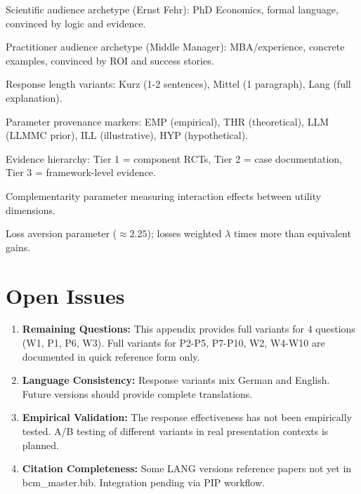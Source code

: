 \begin{description}[nosep]
    \item[$\mathcal{W}$ (Wissenschaft)] Scientific audience archetype (Ernst Fehr): PhD Economics, formal language, convinced by logic and evidence.

    \item[$\mathcal{P}$ (Praxis)] Practitioner audience archetype (Middle Manager): MBA/experience, concrete examples, convinced by ROI and success stories.

    \item[K/M/L] Response length variants: Kurz (1-2 sentences), Mittel (1 paragraph), Lang (full explanation).

    \item[Epistemische Tags] Parameter provenance markers: EMP (empirical), THR (theoretical), LLM (LLMMC prior), ILL (illustrative), HYP (hypothetical).

    \item[Tier 1/2/3] Evidence hierarchy: Tier 1 = component RCTs, Tier 2 = case documentation, Tier 3 = framework-level evidence.

    \item[$\gamma$] Complementarity parameter measuring interaction effects between utility dimensions.

    \item[$\lambda$] Loss aversion parameter ($\approx 2.25$); losses weighted $\lambda$ times more than equivalent gains.
\end{description}

\section{Open Issues}
\label{sec:da2-open}

\begin{enumerate}
    \item \textbf{Remaining Questions:} This appendix provides full variants for 4 questions (W1, P1, P6, W3). Full variants for P2-P5, P7-P10, W2, W4-W10 are documented in quick reference form only.

    \item \textbf{Language Consistency:} Response variants mix German and English. Future versions should provide complete translations.

    \item \textbf{Empirical Validation:} The response effectiveness has not been empirically tested. A/B testing of different variants in real presentation contexts is planned.

    \item \textbf{Citation Completeness:} Some LANG versions reference papers not yet in bcm\_master.bib. Integration pending via PIP workflow.
\end{enumerate}

